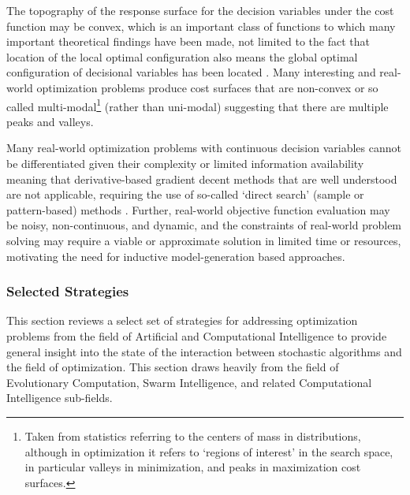 \documentclass[a4paper, 11pt]{article}
\begin{document}
The topography of the response surface for the decision variables under the cost function may be convex, which is an important class of functions to which many important theoretical findings have been made, not limited to the fact that location of the local optimal configuration also means the global optimal configuration of decisional variables has been located \cite{Boyd2004}. Many interesting and real-world optimization problems produce cost surfaces that are non-convex or so called multi-modal\footnote{Taken from statistics referring to the centers of mass in distributions, although in optimization it refers to `regions of interest' in the search space, in particular valleys in minimization, and peaks in maximization cost surfaces.} (rather than uni-modal) suggesting that there are multiple peaks and valleys. 

Many real-world optimization problems with continuous decision variables cannot be differentiated given their complexity or limited information availability meaning that derivative-based gradient decent methods that are well understood are not applicable, requiring the use of so-called `direct search' (sample or pattern-based) methods \cite{Lewis2000}. Further, real-world objective function evaluation may be noisy, non-continuous, and dynamic, and the constraints of real-world problem solving may require a viable or approximate solution in limited time or resources, motivating the need for inductive model-generation based approaches.

%
%
\subsubsection{Selected Strategies}
This section reviews a select set of strategies for addressing optimization problems from the field of Artificial and Computational Intelligence to provide general insight into the state of the interaction between stochastic algorithms and the field of optimization. This section draws heavily from the field of Evolutionary Computation, Swarm Intelligence, and related Computational Intelligence sub-fields.
\end{document}
